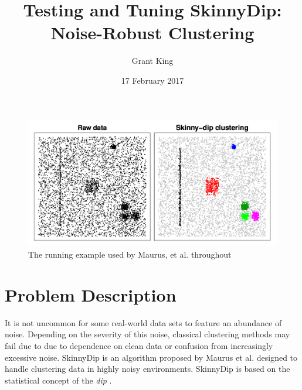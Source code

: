 \documentclass{sig-alternate-05-2015}
\begin{document}


\title{Testing and Tuning SkinnyDip: Noise-Robust Clustering}
\author{
%
%
\alignauthor
Grant King\\
}
\date{17 February 2017}

\maketitle

\begin{figure}[t]
\centering
\includegraphics[width=\textwidth]{images/SkinnyDipExample}
\caption{The running example used by Maurus, et al. throughout \cite{skinnydip}}
\label{fig:sdexample}
\end{figure}

\section{Problem Description}
It is not uncommon for some real-world data sets to feature an abundance of noise. Depending on the severity of this noise, classical clustering methods may fail due to due to dependence on clean data or confusion from increasingly excessive noise. SkinnyDip is an algorithm proposed by Maurus et al.\cite{skinnydip} designed to handle clustering data in highly noisy environments. SkinnyDip is based on the statistical concept of the \textit{dip} \cite{dip}. 
\end{document}
